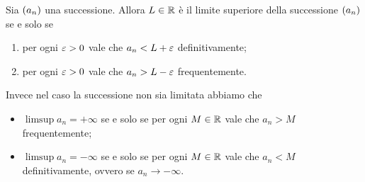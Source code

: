\begin{proposition}
    \label{prop:caratt_3_limsup}
    Sia $\seqn*{a}$ una successione. Allora $L \in \mathbb{R}$ è il limite superiore della successione $\seqn*{a}$ se e solo se
    \begin{enumerate}[label={(\roman*)}]
        \item per ogni $\varepsilon > 0$ vale che $a_n < L + \varepsilon$ definitivamente;
        \item per ogni $\varepsilon > 0$ vale che $a_n > L - \varepsilon$ frequentemente.
    \end{enumerate}

    Invece nel caso la successione non sia limitata abbiamo che \begin{itemize}
        \item $\limsup a_n = +\infty$ se e solo se per ogni $M \in \mathbb{R}$ vale che $a_n > M$ frequentemente;
        \item $\limsup a_n = -\infty$ se e solo se per ogni $M \in \mathbb{R}$ vale che $a_n < M$ definitivamente, ovvero se $a_n \to -\infty$.
    \end{itemize}
\end{proposition}

